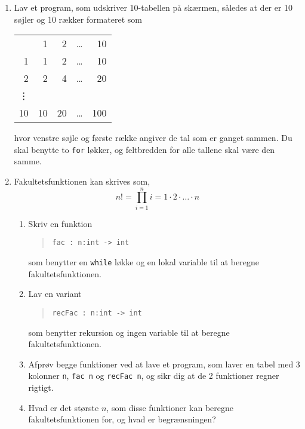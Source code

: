 \documentclass[a4paper,12pt]{article}
\begin{document}
\begin{enumerate}[label=3ø.\arabic*,start=0]
\item \label{multiplicationTable} Lav et program, som udskriver 10-tabellen på skærmen, således at der er 10 søjler og 10 rækker formateret som
  \begin{center}
    \begin{tabular}{rrrrr}
      &1 & 2 & \dots & 10\\
      1 &1 & 2 & \dots & 10\\
      2 &2 & 4 & \dots & 20\\
      \vdots \\
      10 &10 & 20 & \dots & 100\\
    \end{tabular}
  \end{center}
hvor venstre søjle og første række angiver de tal som er ganget sammen. Du skal benytte to \lstinline!for! løkker, og feltbredden for alle tallene skal være den samme. 
\item Fakultetsfunktionen kan skrives som,
  \begin{equation}
    n! = \prod_{i=1}^n i = 1\cdot 2\cdot \ldots \cdot n
  \end{equation}
  \begin{enumerate}
  \item Skriv en funktion
    \begin{quote}
      \mbox{\lstinline!fac : n:int -> int!}
    \end{quote}
som benytter en \lstinline!while! løkke og en lokal variable til at beregne fakultetsfunktionen.
  \item Lav en variant
    \begin{quote}
      \mbox{\lstinline!recFac : n:int -> int!}
    \end{quote}
som benytter rekursion og ingen variable til at beregne fakultetsfunktionen.
  \item Afprøv begge funktioner ved at lave et program, som laver en tabel med 3 kolonner \lstinline!n!, \mbox{\lstinline!fac n!} og \mbox{\lstinline!recFac n!}, og sikr dig at de 2 funktioner regner rigtigt.
  \item Hvad er det største $n$, som disse funktioner kan beregne fakultetsfunktionen for, og hvad er begrænsningen?
  \end{enumerate}
\end{enumerate}
\end{document}
